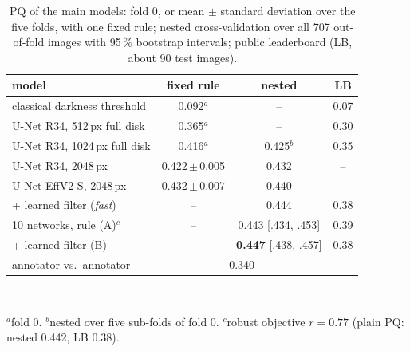 \documentclass[sigconf]{acmart}
\begin{document}
\begin{table}[t]
  \caption{PQ of the main models: fold 0, or mean $\pm$ standard deviation over the five folds, with one fixed rule; nested cross-validation over all 707 out-of-fold images with 95\,\% bootstrap intervals; public leaderboard (LB, about 90 test images).}
  \label{tab:results}
  \small
  \setlength{\tabcolsep}{2.4pt}
  \begin{tabular}{lccc}
    \toprule
    model & fixed rule & nested & LB\\
    \midrule
    classical darkness threshold & 0.092$^a$ & -- & 0.07\\
    U-Net R34, 512\,px full disk & 0.365$^a$ & -- & 0.30\\
    U-Net R34, 1024\,px full disk & 0.416$^a$ & 0.425$^b$ & 0.35\\
    U-Net R34, 2048\,px & 0.422\,$\pm$\,0.005 & 0.432 & --\\
    U-Net EffV2-S, 2048\,px & 0.432\,$\pm$\,0.007 & 0.440 & --\\
    \quad + learned filter (\emph{fast}) & -- & 0.444 & 0.38\\
    10 networks, rule (A)$^c$ & -- & 0.443 {\footnotesize[.434, .453]} & 0.39\\
    \quad + learned filter (B) & -- & \textbf{0.447} {\footnotesize[.438, .457]} & 0.38\\
    \midrule
    annotator vs.\ annotator & \multicolumn{2}{c}{0.340} & --\\
    \bottomrule
  \end{tabular}\\[2pt]
  {\footnotesize $^a$fold 0. $^b$nested over five sub-folds of fold 0. $^c$robust objective $r=0.77$ (plain PQ: nested 0.442, LB 0.38).\par}
\end{table}
\end{document}
